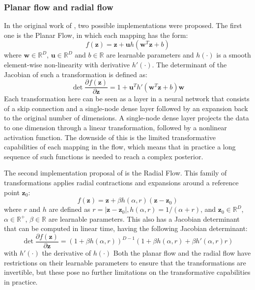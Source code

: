 \documentclass{report}
\newcommand{\R}{\mathbb{R}}
\newcommand{\bu}{\mathbf{u}}
\newcommand{\bw}{\mathbf{w}}
\newcommand{\bz}{\mathbf{z}}
\newcommand{\parfrac}[2]{\frac{\partial #1}{\partial#2}}
\begin{document}
\subsubsection{Planar flow and radial flow}\label{section:planar_radial_flow}
In the original work of \textcite{rezende2016variational}, two possible implementations were proposed. The first one is the Planar Flow, in which each mapping has the form:
\begin{equation}\label{equation:planar_flow}
    f(\bz) = \bz + \bu h(\bw^T\bz + b)
\end{equation}
where $\bw \in \R^D$, $\bu \in \R^D$ and $b \in \R$ are learnable parameters and $h(\cdot)$ is a smooth element-wise non-linearity with derivative $h'(\cdot)$. The determinant of the Jacobian of such a transformation is defined as:
\begin{equation}\label{equation:planar_flow_logdet}
    \det\parfrac{f(\bz)}{\bz}  = 1 + \bu^T h'(\bw^T \bz + b)\bw
\end{equation}
Each transformation here can be seen as a layer in a neural network that consists of a skip connection and a single-node dense layer followed by an expansion back to the original number of dimensions. A single-node dense layer projects the data to one dimension through a linear transformation, followed by a nonlinear activation function. The downside of this is the limited transformative capabilities of each mapping in the flow, which means that in practice a long sequence of such functions is needed to reach a complex posterior.

The second implementation proposal of \textcite{rezende2016variational} is the Radial Flow. This family of transformations applies radial contractions and expansions around a reference point $\bz_0$:
\begin{equation}
    f(\bz) = \bz + \beta h(\alpha, r)(\bz - \bz_0)
\end{equation}
where $r$ and $h$ are defined as $r=|\bz - \bz_0|,  h(\alpha, r) = 1/(\alpha + r)$, and $\bz_0 \in \R^D$, $\alpha \in \R^+$, $\beta \in \R$ are learnable parameters. This also has a Jacobian determinant that can be computed in linear time, having the following Jacobian determinant:
\begin{equation}
    \det \parfrac{f(\bz)}{\bz}  = (1 + \beta h(\alpha, r))^{D-1} (1 + \beta h(\alpha, r) + \beta h'(\alpha, r)r)
\end{equation}
with $h'(\cdot)$ the derivative of $h(\cdot)$ Both the planar flow and the radial flow have restrictions on their learnable parameters to ensure that the transformations are invertible, but these pose no further limitations on the transformative capabilities in practice.
\end{document}
